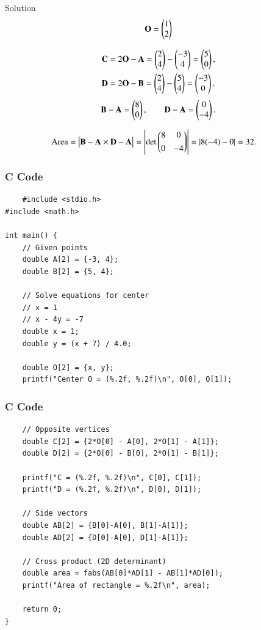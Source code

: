 \documentclass{beamer}
\begin{document}
\begin{frame}{Solution}
\begin{align}
    \mathbf{O}=\begin{pmatrix}1\\2\end{pmatrix}
\end{align}

\begin{align}
\mathbf{C}&=2\mathbf{O}-\mathbf{A}=\begin{pmatrix}2\\4\end{pmatrix}-\begin{pmatrix}-3\\4\end{pmatrix}=\begin{pmatrix}5\\0\end{pmatrix},\\
\mathbf{D}&=2\mathbf{O}-\mathbf{B}=\begin{pmatrix}2\\4\end{pmatrix}-\begin{pmatrix}5\\4\end{pmatrix}=\begin{pmatrix}-3\\0\end{pmatrix}.
\end{align}
\begin{align}
\mathbf{B}-\mathbf{A}=\begin{pmatrix}8\\0\end{pmatrix},\qquad
\mathbf{D}-\mathbf{A}=\begin{pmatrix}0\\-4\end{pmatrix}.
\end{align}

\begin{align}
\text{Area} &= \big|\mathbf{B}-\mathbf{A}\times\mathbf{D}-\mathbf{A}\big|
= \left|\det\begin{pmatrix}8 & 0\\[4pt]0 & -4\end{pmatrix}\right|
= |8(-4)-0| = 32.
\end{align}

\end{frame}
\begin{frame}[fragile]
\frametitle{C Code}
\begin{lstlisting}
    #include <stdio.h>
#include <math.h>

int main() {
    // Given points
    double A[2] = {-3, 4};
    double B[2] = {5, 4};

    // Solve equations for center
    // x = 1
    // x - 4y = -7
    double x = 1;
    double y = (x + 7) / 4.0;

    double O[2] = {x, y};
    printf("Center O = (%.2f, %.2f)\n", O[0], O[1]);
\end{lstlisting}
\end{frame}
\begin{frame}[fragile]
\frametitle{C Code}
\begin{lstlisting}
    // Opposite vertices
    double C[2] = {2*O[0] - A[0], 2*O[1] - A[1]};
    double D[2] = {2*O[0] - B[0], 2*O[1] - B[1]};

    printf("C = (%.2f, %.2f)\n", C[0], C[1]);
    printf("D = (%.2f, %.2f)\n", D[0], D[1]);

    // Side vectors
    double AB[2] = {B[0]-A[0], B[1]-A[1]};
    double AD[2] = {D[0]-A[0], D[1]-A[1]};

    // Cross product (2D determinant)
    double area = fabs(AB[0]*AD[1] - AB[1]*AD[0]);
    printf("Area of rectangle = %.2f\n", area);

    return 0;
}
\end{lstlisting}
\end{frame}
\end{document}

